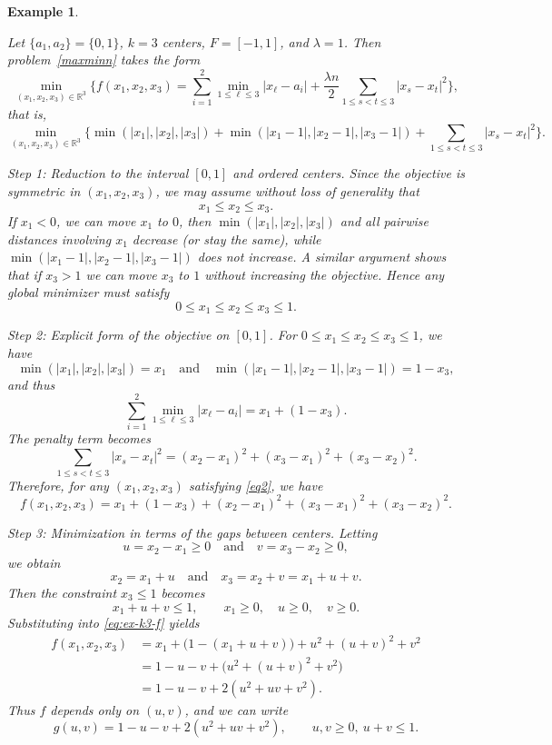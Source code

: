 \documentclass[11pt]{article}
\newtheorem{example}[theorem]{Example}
\theoremstyle{definition}
\newcommand{\R}{\mathbb{R}}
\newcommand{\1}{\mathbf{1}}
\begin{document}
\begin{example}\label{ex:lambda1-k3}
{\rm Let $\{a_1, a_2\} = \{0, 1\}$, $k=3$ centers, $F = [-1, 1]$, and $\lambda = 1$. Then
problem~\eqref{maxminn} takes the form
\[
\min_{(x_1,x_2,x_3)\in\R^3}
\Big\{
f(x_1,x_2,x_3)
=\sum_{i=1}^2\min_{1\le\ell\le 3}|x_\ell-a_i|
+\frac{\lambda n}{2}\sum_{1\le s<t\le 3}|x_s-x_t|^2
\Big\},
\]
that is,
\[
\min_{(x_1,x_2,x_3)\in\R^3}
\Big\{
\min(|x_1|,|x_2|,|x_3|)
+\min(|x_1-1|,|x_2-1|,|x_3-1|)
+\sum_{1\le s<t\le 3}|x_s-x_t|^2
\Big\}.
\]

\medskip\noindent
\emph{Step 1: Reduction to the interval $[0,1]$ and ordered centers.}
Since the objective is symmetric in $(x_1,x_2,x_3)$, we may assume without loss
of generality that
\[
x_1\le x_2\le x_3.
\]
If $x_1<0$, we can move $x_1$ to $0$, then $\min(|x_1|,|x_2|,|x_3|)$ and all
pairwise distances involving $x_1$ decrease (or stay the same), while
$\min(|x_1-1|,|x_2-1|,|x_3-1|)$ does not increase. A similar argument shows
that if $x_3>1$ we can move $x_3$ to $1$ without increasing the objective.
Hence any global minimizer must satisfy
\begin{equation}\label{eq2}
0\le x_1\le x_2\le x_3\le 1.
\end{equation}

\medskip\noindent
\emph{Step 2: Explicit form of the objective on $[0,1]$.}
For $0\le x_1\le x_2\le x_3\le 1$, we have
\[
\min(|x_1|,|x_2|,|x_3|)=x_1\quad\text{and}\quad
\min(|x_1-1|,|x_2-1|,|x_3-1|)=1-x_3,
\]
and thus
\[
\sum_{i=1}^2\min_{1\le\ell\le 3}|x_\ell-a_i|
=
x_1+(1-x_3).
\]
The penalty term becomes
\[
\sum_{1\le s<t\le 3}|x_s-x_t|^2
=
(x_2-x_1)^2+(x_3-x_1)^2+(x_3-x_2)^2.
\]
Therefore, for any $(x_1,x_2,x_3)$ satisfying \eqref{eq2}, we have
\begin{equation}\label{eq:ex-k3-f}
f(x_1,x_2,x_3)
=
x_1+(1-x_3)
+(x_2-x_1)^2+(x_3-x_1)^2+(x_3-x_2)^2.
\end{equation}

\medskip\noindent
\emph{Step 3: Minimization in terms of the gaps between centers.}
Letting
\[
u=x_2-x_1\ge0\quad\text{and}\quad v=x_3-x_2\ge0,
\]
we obtain
\[
x_2=x_1+u\quad\text{and}\quad x_3=x_2+v=x_1+u+v.
\]
Then the constraint $x_3\le 1$ becomes
\begin{equation*}\label{eq:ex-k3-ab-dom}
x_1+u+v\le1,\qquad x_1\ge0,\quad u\ge0,\quad v\ge0.
\end{equation*}
Substituting into \eqref{eq:ex-k3-f} yields
\[
\begin{aligned}
f(x_1,x_2,x_3)
&=x_1+\bigl(1-(x_1+u+v)\bigr)
+u^2+(u+v)^2+v^2\\[0.2em]
&=1-u-v +\bigl(u^2+(u+v)^2+v^2\bigr)\\[0.2em]
&=1-u-v +2(u^2+uv+v^2).
\end{aligned}
\]
Thus $f$ depends only on $(u,v)$, and we can write
\[
g(u,v)=
1-u-v+2(u^2+uv+v^2),\qquad u,v\ge0,\ u+v\le1.
\]

}
\end{example}
\end{document}
